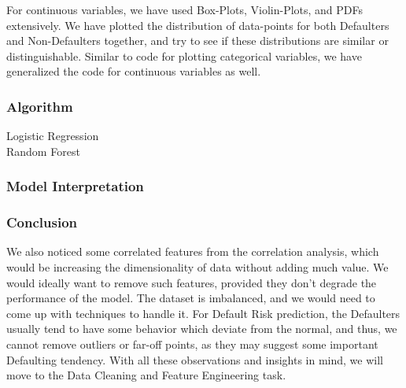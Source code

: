 \documentclass[twoside,a4paper]{article}
\begin{document}
For continuous variables, we have used Box-Plots, Violin-Plots, and PDFs extensively. We have plotted the distribution of data-points for both Defaulters and Non-Defaulters together, and try to see if these distributions are similar or distinguishable.
Similar to code for plotting categorical variables, we have generalized the code for continuous variables as well.

\subsubsection{Algorithm}
Logistic Regression \\
Random Forest
\subsubsection{Model Interpretation}
\subsubsection{Conclusion}
We also noticed some correlated features from the correlation analysis, which would be increasing the dimensionality of data without adding much value. We would ideally want to remove such features, provided they don’t degrade the performance of the model.
The dataset is imbalanced, and we would need to come up with techniques to handle it.
For Default Risk prediction, the Defaulters usually tend to have some behavior which deviate from the normal, and thus, we cannot remove outliers or far-off points, as they may suggest some important Defaulting tendency.
With all these observations and insights in mind, we will move to the Data Cleaning and Feature Engineering task.

\end{document}
